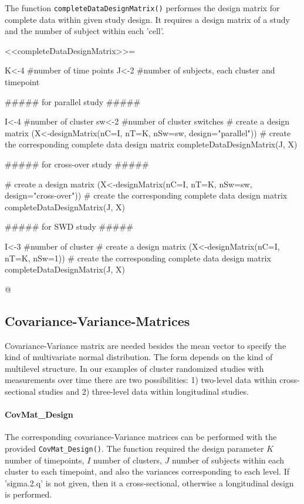 \documentclass{article}
\newcommand{\Rfunction}[1]{{\texttt{#1}}}
\begin{document}
The function \Rfunction{completeDataDesignMatrix()} performes the design matrix for complete data within given study design. It requires a design matrix of a study and the number of subject within each 'cell'.

<<completeDataDesignMatrix>>=

K<-4  #number of  time points
J<-2 #number of subjects, each cluster and timepoint

##### for parallel study #####

I<-4 #number of cluster
sw<-2 #number of cluster switches
# create a design matrix
(X<-designMatrix(nC=I, nT=K, nSw=sw, design="parallel"))
# create the corresponding complete data design matrix
completeDataDesignMatrix(J, X)

##### for cross-over study #####

# create a design matrix 
(X<-designMatrix(nC=I, nT=K, nSw=sw, design="cross-over"))
# create the corresponding complete data design matrix
completeDataDesignMatrix(J, X)

##### for SWD study #####

I<-3 #number of cluster
# create a design matrix
(X<-designMatrix(nC=I, nT=K, nSw=1)) 
# create the corresponding complete data design matrix
completeDataDesignMatrix(J, X)

@

\subsection{Covariance-Variance-Matrices}

Covariance-Variance matrix are needed besides the mean vector to specify the kind of multivariate normal distribution. The form depends on the kind of multilevel structure. In our examples of cluster randomized studies with measurements over time there are two possibilities: 1) two-level data within cross-sectional studies and 2) three-level data within longitudinal studies. 

\paragraph{CovMat\_Design}

The corresponding covariance-Variance matrices 
can be performed with the provided \Rfunction{CovMat\_Design()}. The function required the design parameter $K$ number of timepoints, $I$ number of clusters, $J$ number of subjects within each cluster to each timepoint, and also the variances corresponding to each level. If 'sigma.2.q' is not given, then it a cross-sectional, otherwise a longitudinal design is performed.
\end{document}
